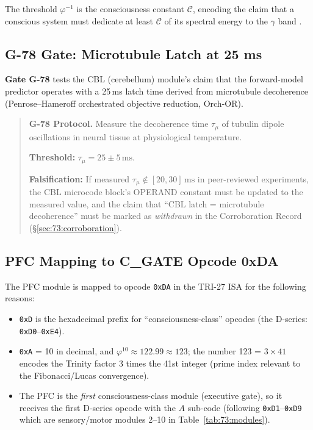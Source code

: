 The threshold $\varphi^{-1}$ is the consciousness constant
$\mathcal{C}$, encoding the claim that a conscious system must
dedicate at least $\mathcal{C}$ of its spectral energy to the
$\gamma$ band \cite{fries2015rhythms}.

\subsection{G-78 Gate: Microtubule Latch at 25 ms}
\label{sec:73:g78}

\textbf{Gate G-78} tests the CBL (cerebellum) module's claim
that the forward-model predictor operates with a 25\,ms latch time
derived from microtubule decoherence (Penrose--Hameroff
orchestrated objective reduction, Orch-OR).

\begin{quote}
\textbf{G-78 Protocol.}
Measure the decoherence time $\tau_{\mu}$ of tubulin dipole
oscillations in neural tissue at physiological temperature.

\textbf{Threshold:} $\tau_{\mu} = 25 \pm 5\,\mathrm{ms}$.

\textbf{Falsification:} If measured
$\tau_{\mu} \notin [20,30]\,\mathrm{ms}$ in peer-reviewed
experiments, the CBL microcode block's OPERAND constant must be
updated to the measured value, and the claim that
``CBL latch = microtubule decoherence'' must be marked as
\emph{withdrawn} in the Corroboration Record
(§\ref{sec:73:corroboration}).
\end{quote}

\subsection{PFC Mapping to C\_GATE Opcode 0xDA}
\label{sec:73:pfc-opcode}

The PFC module is mapped to opcode \texttt{0xDA} in the TRI-27
ISA for the following reasons:
\begin{itemize}
  \item \texttt{0xD} is the hexadecimal prefix for
        ``consciousness-class'' opcodes (the D-series:
        \texttt{0xD0}--\texttt{0xE4}).
  \item \texttt{0xA} = 10 in decimal, and
        $\varphi^{10} \approx 122.99 \approx 123$;
        the number 123 = $3 \times 41$ encodes the Trinity
        factor 3 times the 41st integer (prime index relevant to
        the Fibonacci/Lucas convergence).
  \item The PFC is the \emph{first} consciousness-class module
        (executive gate), so it receives the first
        D-series opcode with the $A$ sub-code
        (following \texttt{0xD1}--\texttt{0xD9} which are
        sensory/motor modules 2--10 in Table~\ref{tab:73:modules}).
\end{itemize}

